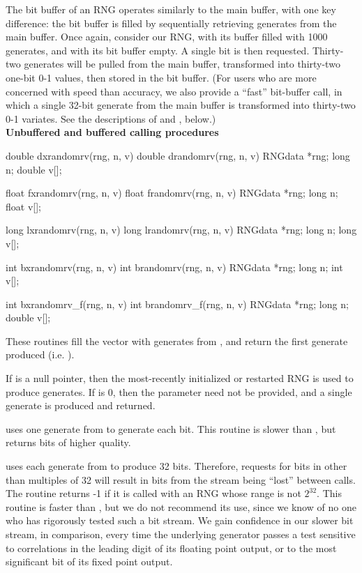 The bit buffer of an RNG operates similarly to the main buffer, with one
key difference: the bit buffer is filled by sequentially retrieving
generates from the main buffer.  Once again, consider our RNG, with its
buffer filled with 1000 generates, and with its bit buffer empty.  A
single bit is then requested.  Thirty-two generates will be pulled from
the main buffer, transformed into thirty-two one-bit 0-1 values, then
stored in the bit buffer.  (For users who are more concerned with speed
than accuracy, we also provide a ``fast'' bit-buffer call, in which a
single 32-bit generate from the main buffer is transformed into
thirty-two 0-1 variates.  See the descriptions of  and
, below.)\\

\pagebreak
\noindent
{\bf Unbuffered and buffered calling procedures\\}

\begin{example}
	double dxrandomrv(rng, n, v)
	double drandomrv(rng, n, v)
	RNGdata *rng;
	long n;
	double v[];

	float fxrandomrv(rng, n, v)
	float frandomrv(rng, n, v)
	RNGdata *rng;
	long n;
	float v[];

	long lxrandomrv(rng, n, v)
	long lrandomrv(rng, n, v)
	RNGdata *rng;
	long n;
	long v[];

	int bxrandomrv(rng, n, v)
	int brandomrv(rng, n, v)
	RNGdata *rng;
	long n;
	int v[];

	int bxrandomrv_f(rng, n, v)
	int brandomrv_f(rng, n, v)
	RNGdata *rng;
	long n;
	double v[];\\
\end{example}

These routines fill the vector  with  generates from
, and return the first generate produced (i.e. ).

If  is a null pointer, then the most-recently initialized or
restarted RNG is used to produce generates.  If  is 0, then the
 parameter need not be provided, and a single generate is
produced and returned.

 uses one generate from  to generate each
bit.  This routine is slower than , but returns bits
of higher quality.

\begin{tex}
 uses each generate from  to produce 32
bits.  Therefore, requests for bits in other than multiples of 32 will
result in bits from the stream being ``lost'' between calls.  The
routine returns -1 if it is called with an RNG whose range is not $2^{32}$.
This routine is faster than , but we do not recommend
its use, since we know of no one who has rigorously tested such a bit
stream.  We gain confidence in our slower  bit stream,
in comparison, every time the underlying generator passes a test
sensitive to correlations in the leading digit of its floating point
output, or to the most significant bit of its fixed point output.
\end{tex}

